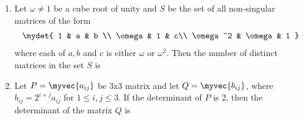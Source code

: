 \begin{enumerate}
                \begin{enumerate}
                \end{enumerate}
            \item Let $\omega \neq 1$ be a cube root of unity and $S$ be the set of all non-singular matrices of the form 
                \begin{align*}
                    \mydet{
                        1 & a & b \\
                        \omega & 1 & c\\
                        \omega^2 & \omega & 1
                    }
                \end{align*} where each of $a,b$ and $c$ is either $\omega$ or $\omega^2$. Then the number of distinct matrices in the set $S$ is
                \hfill{}

                \begin{enumerate}

                \end{enumerate}

            \item Let $P = \myvec{a_{ij}}$ be 3x3 matrix and let $Q =  \myvec{b_{ij}}$, where $b_{ij} = 2^{i+j}a_{ij}$ for $1 \le i,j \le 3$. If the determinant of $P$ is 2, then the determinant of the matrix $Q$ is 
                \hfill{}
                \begin{enumerate}

                \end{enumerate}


\end{enumerate}
